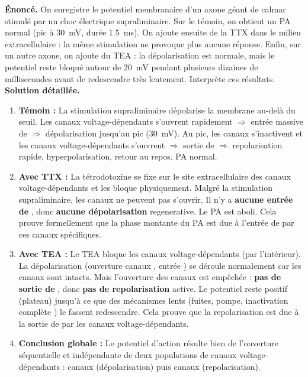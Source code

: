 \documentclass[11pt]{article}
\begin{document}
\begin{exoresolu}
\textbf{Énoncé.} On enregistre le potentiel membranaire d'un axone géant de calmar stimulé par un choc électrique supraliminaire. Sur le témoin, on obtient un PA normal (pic à \SI{+30}{mV}, durée \SI{1,5}{ms}). On ajoute ensuite de la TTX dans le milieu extracellulaire : la même stimulation ne provoque plus aucune réponse. Enfin, sur un autre axone, on ajoute du TEA : la dépolarisation est normale, mais le potentiel reste bloqué autour de \SI{+20}{mV} pendant plusieurs dizaines de millisecondes avant de redescendre très lentement. Interprète ces résultats.
\tcblower
\textbf{Solution détaillée.}
\begin{enumerate}
\item \textbf{Témoin :} La stimulation supraliminaire dépolarise la membrane au-delà du seuil. Les canaux  voltage-dépendants s'ouvrent rapidement $\Rightarrow$ entrée massive de  $\Rightarrow$ dépolarisation jusqu'au pic (\SI{+30}{mV}). Au pic, les canaux  s'inactivent et les canaux  voltage-dépendants s'ouvrent $\Rightarrow$ sortie de  $\Rightarrow$ repolarisation rapide, hyperpolarisation, retour au repos. PA normal.
\item \textbf{Avec TTX :} La tétrodotoxine se fixe sur le site extracellulaire des canaux  voltage-dépendants et les bloque physiquement. Malgré la stimulation supraliminaire, les canaux  ne peuvent pas s'ouvrir. Il n'y a \textbf{aucune entrée de }, donc \textbf{aucune dépolarisation} regenerative. Le PA est aboli. Cela prouve formellement que la phase montante du PA est due à l'entrée de  par ces canaux spécifiques.
\item \textbf{Avec TEA :} Le TEA bloque les canaux  voltage-dépendants (par l'intérieur). La dépolarisation (ouverture canaux , entrée ) se déroule normalement car les canaux  sont intacts. Mais l'ouverture des canaux  est empêchée : \textbf{pas de sortie de }, donc \textbf{pas de repolarisation} active. Le potentiel reste positif (plateau) jusqu'à ce que des mécanismes lents (fuites, pompe, inactivation complète ) le fassent redescendre. Cela prouve que la repolarisation est due à la sortie de  par les canaux  voltage-dépendants.
\item \textbf{Conclusion globale :} Le potentiel d'action résulte bien de l'ouverture séquentielle et indépendante de deux populations de canaux voltage-dépendants : canaux  (dépolarisation) puis canaux  (repolarisation).
\end{enumerate}
\end{exoresolu}
\end{document}
